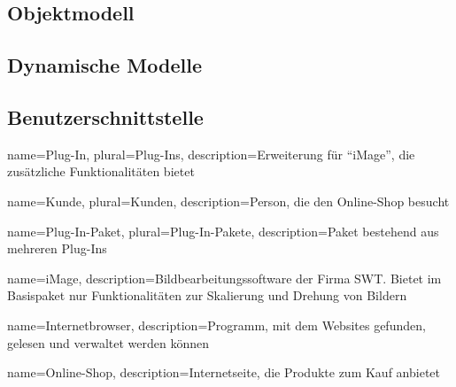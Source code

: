 \documentclass[titlepage=true, parskip=full]{scrartcl}
\begin{document}
\subsection{Objektmodell}

\subsection{Dynamische Modelle}

\subsection{Benutzerschnittstelle}




%
%
%
%
{
	name=Plug-In,
	plural=Plug-Ins,
	description={Erweiterung für \enquote{\gls{iMage}}, die zusätzliche Funktionalitäten bietet}
}

{
	name=Kunde,
	plural=Kunden,
	description={Person, die den \gls{Online-Shop} besucht}
}

{
	name=Plug-In-Paket,
	plural=Plug-In-Pakete,
	description={Paket bestehend aus mehreren \glspl{Plug-In}}
}

{
	name={iMage},
	description={Bildbearbeitungssoftware der Firma SWT. Bietet im Basispaket nur Funktionalitäten zur Skalierung und Drehung von Bildern}
}

{
	name={Internetbrowser},
	description={Programm, mit dem Websites gefunden, gelesen und verwaltet werden können}
}

{
	name={Online-Shop},
	description={Internetseite, die Produkte zum Kauf anbietet}
}
\end{document}
